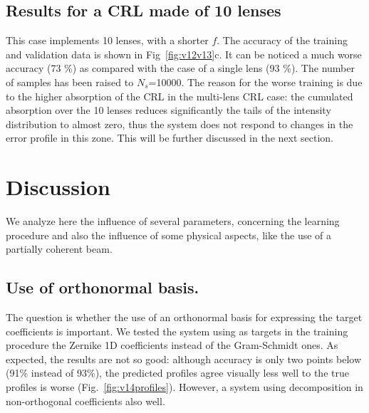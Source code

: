 \documentclass[preprint]{iucr}
\newcommand{\inred}[1]{{\color{red}#1}}
\begin{document}
\subsection{Results for a CRL made of 10 lenses}
 This case implements 10 lenses, with a shorter $f$. The accuracy of the training and validation data is shown in 
 Fig~\ref{fig:v12v13}c.
 It can be noticed a much worse accuracy (\inred{73 \%}) as compared with the case of a single lens (\inred{93 \%}). The number of samples has been raised to $N_s$=10000. The reason for the worse training is due to the higher absorption of the CRL in the multi-lens CRL case: the cumulated absorption over the 10 lenses reduces significantly the tails of the intensity distribution to almost zero, thus the system does not respond to changes in the error profile in this zone. This will be further discussed in the next section.

\section{Discussion}\label{sec:discussion}

We analyze here the influence of several parameters, concerning the learning procedure and also the influence of some physical aspects, like the use of a partially coherent beam.

\subsection{Use of orthonormal basis.} The question is whether the use of an orthonormal basis for expressing the target coefficients is important. We tested the system using as targets in the training procedure the Zernike 1D coefficients instead of the Gram-Schmidt ones. As expected, the results are not so good: although 
accuracy is only two points below (91\% instead of 93\%), the predicted profiles agree visually less well to the true profiles is worse (Fig.~\ref{fig:v14profiles}). However, a system using decomposition in non-orthogonal coefficients also well. 
\end{document}
